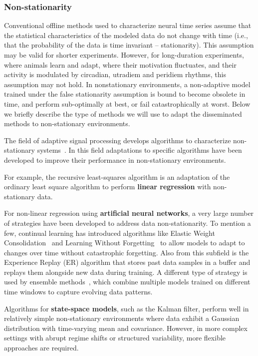 \subsubsection*{Non-stationarity}

Conventional offline methods used to characterize neural time series assume
that the statistical characteristics of the modeled data do not change with
time (i.e., that the probability of the data is time invariant --
stationarity). This assumption may be valid for shorter experiments. However,
for long-duration experiments, where animals learn and adapt, where their
motivation fluctuates, and their activity is modulated by circadian, utradiem
and peridiem rhythms, this assumption may not hold. In nonstationary
environments, a non-adaptive model trained under the false stationarity
assumption is bound to become obsolete in time, and perform sub-optimally at
best, or fail catastrophically at worst.
%
Below we briefly describe the type of methods we will use to adapt the
disseminated methods to non-stationary environments.

The field of adaptive signal processing develops algorithms to characterize
non-stationary systems~\citep{haykin02}. In this field adaptations to specific
algorithms have been developed to improve their performance in non-stationary
environments.

For example, the recursive least-squares algorithm \citep[][Chapter
9]{haykin02} is an adaptation of the ordinary least square algorithm to perform
\textbf{linear regression} with non-stationary data.

For non-linear regression using \textbf{artificial neural networks}, a very large number
of strategies have been developed to address data non-stationarity. To mention
a few, continual learning has introduced algorithms like  Elastic Weight
Consolidation~\citep[EWC][]{} and Learning Without Forgetting~\citep[LwF][]{}
to allow models to adapt to changes over time without catastrophic forgetting.
Also from this subfield is the Experience Replay (ER) algorithm that stores
past data samples in a buffer and replays them alongside new data during
training. A different type of strategy is used by ensemble methods~\citep{},
which combine multiple models trained on different time windows to capture
evolving data patterns.

Algorithms for \textbf{state-space models}, such as the Kalman filter, perform well in
relatively simple non-stationary environments where data exhibit a Gaussian
distribution with time-varying mean and covariance. However, in more complex
settings with abrupt regime shifts or structured variability, more flexible
approaches are required.

